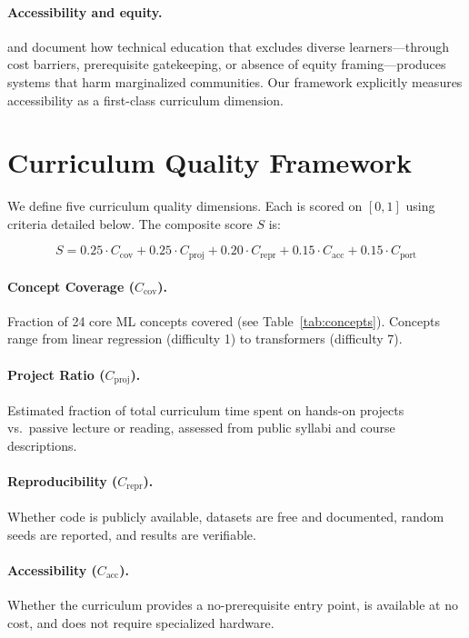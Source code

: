 \documentclass[10pt,twocolumn]{article}
\begin{document}
\paragraph{Accessibility and equity.}
\citet{buolamwini2018gender} and \citet{benjamin2019race} document how technical 
education that excludes diverse learners—through cost barriers, prerequisite gatekeeping, 
or absence of equity framing—produces systems that harm marginalized communities.
Our framework explicitly measures accessibility as a first-class curriculum dimension.

\section{Curriculum Quality Framework}

We define five curriculum quality dimensions. Each is scored on $[0, 1]$ using 
criteria detailed below. The composite score $S$ is:

\begin{equation}
S = 0.25 \cdot C_{\text{cov}} + 0.25 \cdot C_{\text{proj}} + 0.20 \cdot C_{\text{repr}} 
    + 0.15 \cdot C_{\text{acc}} + 0.15 \cdot C_{\text{port}}
\label{eq:composite}
\end{equation}

\paragraph{Concept Coverage ($C_{\text{cov}}$).}
Fraction of 24 core ML concepts covered (see Table~\ref{tab:concepts}). 
Concepts range from linear regression (difficulty 1) to transformers (difficulty 7).

\paragraph{Project Ratio ($C_{\text{proj}}$).}
Estimated fraction of total curriculum time spent on hands-on projects vs.\ 
passive lecture or reading, assessed from public syllabi and course descriptions.

\paragraph{Reproducibility ($C_{\text{repr}}$).}
Whether code is publicly available, datasets are free and documented, 
random seeds are reported, and results are verifiable.

\paragraph{Accessibility ($C_{\text{acc}}$).}
Whether the curriculum provides a no-prerequisite entry point, is available 
at no cost, and does not require specialized hardware.
\end{document}
